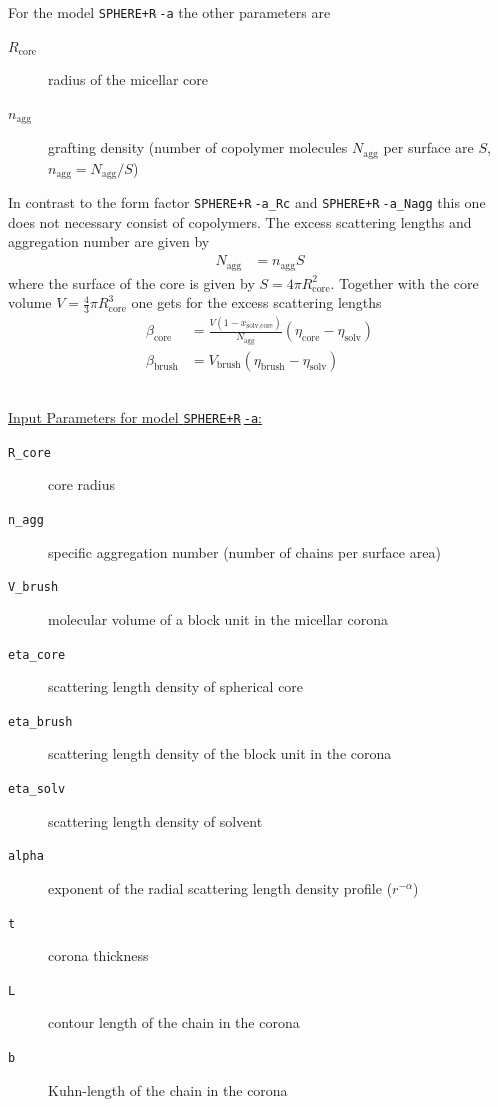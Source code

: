 \vspace{3mm}
\noindent
For the model \texttt{SPHERE+R$\hat{~}$-a} the other parameters are
\begin{description}
\item[$R_\text{core}$] radius of the micellar core
\item[$n_\text{agg}$] grafting density (number of copolymer molecules
$N_\text{agg}$ per surface are $S$, $n_\text{agg}=N_\text{agg}/S$)
\end{description}

\noindent
In contrast to the form factor \texttt{SPHERE+R$\hat{~}$-a\_Rc} and \texttt{SPHERE+R$\hat{~}$-a\_Nagg}
this one does not necessary consist of copolymers.
The excess scattering lengths and aggregation number are given by
\begin{align}
N_\text{agg} &= n_\text{agg} S
\end{align}
where the surface of the core is given by $S=4\pi R_\text{core}^2$. Together with the
core volume  $V =\frac{4}{3}\pi R_\text{core}^3$ one gets for the excess scattering
lengths
\begin{align}
\beta_\text{core} &= \frac{V (1-x_\text{solv,core})}{N_\text{agg}}
(\eta_\text{core}-\eta_\text{solv}) \\
\beta_\text{brush} &= V_\text{brush} (\eta_\text{brush}-\eta_\text{solv})
\end{align}

\vspace{3mm}

\hspace{1pt}\\
\uline{Input Parameters for model \texttt{SPHERE+R$\hat{~}$-a}:}
\begin{description}
\item[\texttt{R\_core}] core radius
\item[\texttt{n\_agg}] specific aggregation number (number of chains per surface area)
\item[\texttt{V\_brush}]  molecular volume of a block unit in the micellar corona
\item[\texttt{eta\_core}] scattering length density of spherical core
\item[\texttt{eta\_brush}] scattering length density of the block unit in the corona
\item[\texttt{eta\_solv}] scattering length density of solvent
\item[\texttt{alpha}] exponent of the radial scattering length density profile ($r^{-\alpha}$)
\item[\texttt{t}] corona thickness
\item[\texttt{L}] contour length of the chain in the corona
\item[\texttt{b}] Kuhn-length of the chain in the corona
\end{description}

